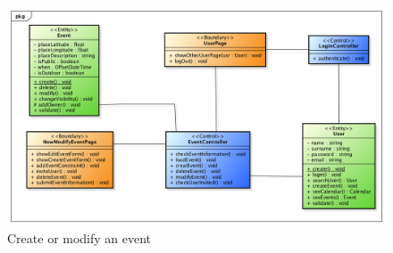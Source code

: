 \begin{center}
 \begin{figure}[H]
    \includegraphics[width=1\textwidth]{../BCEDiagram/BCE/EntityOverview/EventManagementBCE.png}
    \caption{Create or modify an event}
     \label{fig:editneweventBCE}
     \end{figure}
   \end{center}  
